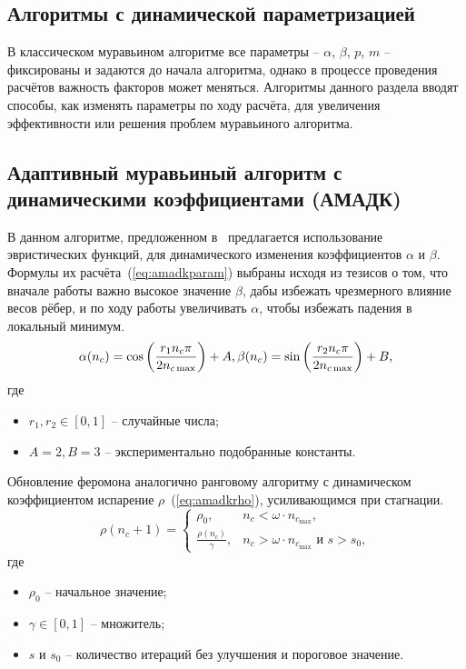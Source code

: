 \subsection{Алгоритмы с динамической параметризацией}

В классическом муравьином алгоритме все параметры -- $\alpha$, $\beta$, $p$, $m$ -- фиксированы и задаются до начала алгоритма, однако в процессе проведения расчётов важность факторов может меняться. Алгоритмы данного раздела вводят способы, как изменять параметры по ходу расчёта, для увеличения эффективности или решения проблем муравьиного алгоритма.

\subsection*{Адаптивный муравьиный алгоритм с динамическими коэффициентами (АМАДК)}

В данном алгоритме, предложенном в~\cite{adla} предлагается использование эвристических функций, для динамического изменения коэффициентов  $\alpha$ и $\beta$. Формулы их расчёта~(\ref{eq:amadkparam}) выбраны исходя из тезисов о том, что вначале работы важно высокое значение $\beta$, дабы избежать чрезмерного влияние весов рёбер, и по ходу работы увеличивать $\alpha$, чтобы избежать падения в локальный минимум. 
\begin{equation}
\alpha(n_c)=\cos\left(\frac{r_1 n_c\pi}{2 n_{c\max}}\right)+A, \\
\beta(n_c)=\sin\left(\frac{r_2 n_c\pi}{2 n_{c\max}}\right)+B,
\label{eq:amadkparam}
\end{equation}
где
\begin{itemize}
	\item $r_1, r_2 \in [0,1]$ -- случайные числа;
	\item  $A=2, B=3$ -- экспериментально подобранные константы.
\end{itemize}
 
Обновление феромона аналогично ранговому алгоритму с динамическом коэффициентом испарение $\rho$~(\ref{eq:amadkrho}), усиливающимся при стагнации.
\begin{equation}
\rho(n_c + 1) = 
\begin{cases}
	\rho_0, & n_c < \omega \cdot n_{c_{\max}}, \\
	\frac{\rho(n_c)}{\gamma} , & n_c > \omega \cdot n_{c_{\max}} \text{ и } s > s_0,
	\label{eq:amadkrho}
\end{cases}
\end{equation}
где 
\begin{itemize}
	\item $\rho_0$ -- начальное значение;
	\item $\gamma \in [0, 1]$ -- множитель;
	\item $s$ и $s_0$ -- количество итераций без улучшения и пороговое значение.
\end{itemize}

